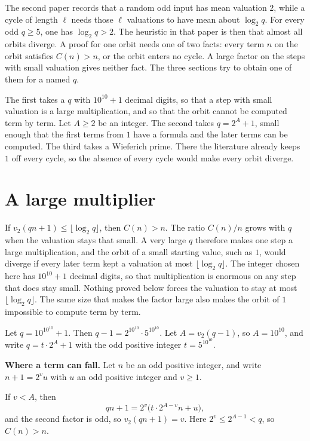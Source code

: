 \documentclass[11pt]{article}
\newcommand{\topic}[1]{\par\noindent\textbf{#1}}
\begin{document}
The second paper records that a random odd input has mean valuation \(2\), while a cycle of length \(\ell\) needs those \(\ell\) valuations to have mean about \(\log_2 q\).
For every odd \(q \ge 5\), one has \(\log_2 q > 2\).
The heuristic in that paper is then that almost all orbits diverge.
A proof for one orbit needs one of two facts: every term \(n\) on the orbit satisfies \(C(n) > n\), or the orbit enters no cycle.
A large factor on the steps with small valuation gives neither fact.
The three sections try to obtain one of them for a named \(q\).

The first takes a \(q\) with \(10^{10} + 1\) decimal digits, so that a step with small valuation is a large multiplication, and so that the orbit cannot be computed term by term.
Let \(A \ge 2\) be an integer.
The second takes \(q = 2^A + 1\), small enough that the first terms from \(1\) have a formula and the later terms can be computed.
The third takes a Wieferich prime.
There the literature already keeps \(1\) off every cycle, so the absence of every cycle would make every orbit diverge.

\section{A large multiplier}
\label{sec:large}

If \(v_2(qn+1) \le \lfloor \log_2 q \rfloor\), then \(C(n) > n\).
The ratio \(C(n)/n\) grows with \(q\) when the valuation stays that small.
A very large \(q\) therefore makes one step a large multiplication, and the orbit of a small starting value, such as \(1\), would diverge if every later term kept a valuation at most \(\lfloor \log_2 q \rfloor\).
The integer chosen here has \(10^{10} + 1\) decimal digits, so that multiplication is enormous on any step that does stay small.
Nothing proved below forces the valuation to stay at most \(\lfloor \log_2 q \rfloor\).
The same size that makes the factor large also makes the orbit of \(1\) impossible to compute term by term.

Let \(q = 10^{10^{10}} + 1\).
Then \(q - 1 = 2^{10^{10}} \cdot 5^{10^{10}}\).
Let \(A = v_2(q-1)\), so \(A = 10^{10}\), and write \(q = t \cdot 2^A + 1\) with the odd positive integer \(t = 5^{10^{10}}\).

\topic{Where a term can fall.}
Let \(n\) be an odd positive integer, and write \(n + 1 = 2^v u\) with \(u\) an odd positive integer and \(v \ge 1\).

If \(v < A\), then
\[
qn + 1 = 2^v \bigl(t \cdot 2^{A-v} n + u\bigr),
\]
and the second factor is odd, so \(v_2(qn+1) = v\).
Here \(2^v \le 2^{A-1} < q\), so \(C(n) > n\).
\end{document}
